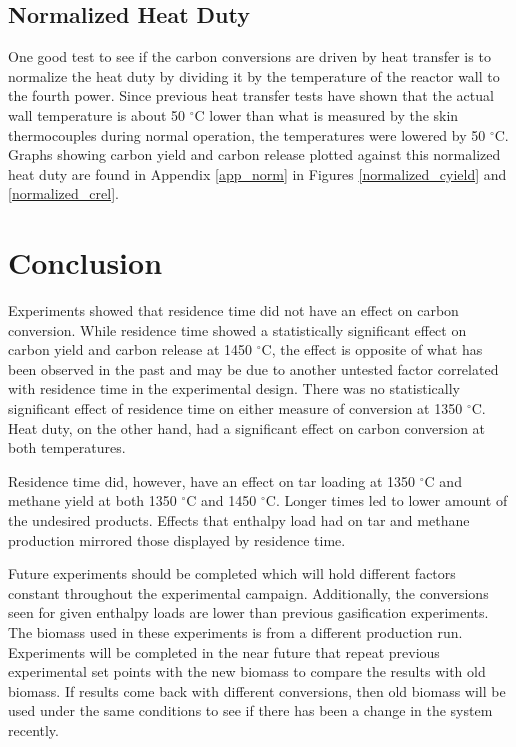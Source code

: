 \documentclass[11pt,twocolumn]{article}
\begin{document}
\subsection*{Normalized Heat Duty}

One good test to see if the carbon conversions are driven by heat transfer is to normalize the heat duty by dividing it by the temperature of the reactor wall to the fourth power.  Since previous heat transfer tests have shown that the actual wall temperature is about 50 $^\circ$C lower than what is measured by the skin thermocouples during normal operation, the temperatures were lowered by 50 $^\circ$C.  Graphs showing carbon yield and carbon release plotted against this normalized heat duty are found in Appendix \ref{app_norm} in Figures \ref{normalized_cyield} and \ref{normalized_crel}.


\balance
\section*{Conclusion}

Experiments showed that residence time did not have an effect on carbon conversion.  While residence time showed a statistically significant effect on carbon yield and carbon release at 1450 $^\circ$C, the effect is opposite of what has been observed in the past and may be due to another untested factor correlated with residence time in the experimental design.  There was no statistically significant effect of residence time on either measure of conversion at 1350 $^\circ$C.  Heat duty, on the other hand, had a significant effect on carbon conversion at both temperatures.

Residence time did, however, have an effect on tar loading at 1350 $^\circ$C and methane yield at both 1350 $^\circ$C and 1450 $^\circ$C.  Longer times led to lower amount of the undesired products.  Effects that enthalpy load had on tar and methane production mirrored those displayed by residence time.

Future experiments should be completed which will hold different factors constant throughout the experimental campaign.  Additionally, the conversions seen for given enthalpy loads are lower than previous gasification experiments.  The biomass used in these experiments is from a different production run.  Experiments will be completed in the near future that repeat previous experimental set points with the new biomass to compare the results with old biomass.  If results come back with different conversions, then old biomass will be used under the same conditions to see if there has been a change in the system recently.
\end{document}
